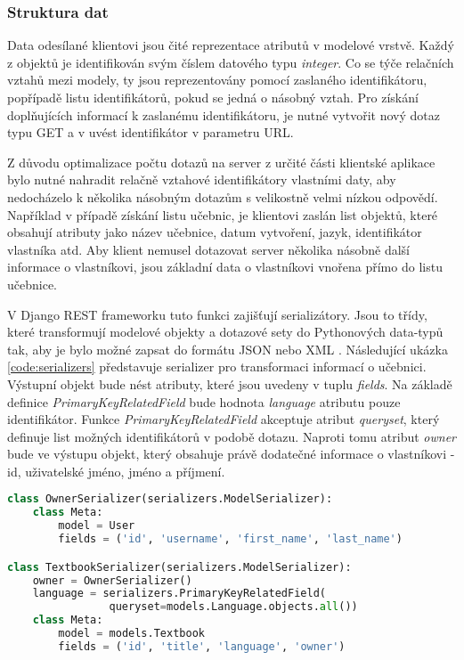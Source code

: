 \documentclass[a4paper,11pt,titlepage,fleqn]{article}
\begin{document}
        \subsubsection{Struktura dat}
            Data odesílané klientovi jsou čité reprezentace atributů v modelové vrstvě. Každý z objektů je identifikován svým číslem datového typu \textit{integer}. Co se týče relačních vztahů mezi modely, ty jsou reprezentovány pomocí zaslaného identifikátoru, popřípadě listu identifikátorů, pokud se jedná o násobný vztah. Pro získání doplňujících informací k zaslanému identifikátoru, je nutné vytvořit nový dotaz typu GET a v uvést identifikátor v parametru URL. 

            Z důvodu optimalizace počtu dotazů na server z určité části klientské aplikace bylo nutné nahradit relačně vztahové identifikátory vlastními daty, aby nedocházelo k několika násobným dotazům s velikostně velmi nízkou odpovědí. Například v případě získání listu učebnic, je klientovi zaslán list objektů, které obsahují atributy jako název učebnice, datum vytvoření, jazyk, identifikátor vlastníka atd. Aby klient nemusel dotazovat server několika násobně další informace o vlastníkovi, jsou základní data o vlastníkovi vnořena přímo do listu učebnice.

            V Django REST frameworku tuto funkci zajišťují serializátory. Jsou to třídy, které transformují modelové objekty a dotazové sety do Pythonových data-typů tak, aby je bylo možné zapsat do formátu JSON nebo XML \cite{bib:django-rest}. Následující ukázka \ref{code:serializers} představuje serializer pro transformaci informací o učebnici. Výstupní objekt bude nést atributy, které jsou uvedeny v tuplu \textit{fields}. Na základě definice \textit{PrimaryKeyRelatedField} bude hodnota \textit{language} atributu pouze identifikátor. Funkce \textit{PrimaryKeyRelatedField} akceptuje atribut \textit{queryset}, který definuje list možných identifikátorů v podobě dotazu. Naproti tomu atribut \textit{owner} bude ve výstupu objekt, který obsahuje právě dodatečné informace o vlastníkovi - id, uživatelské jméno, jméno a příjmení. 

\begin{lstlisting}[language=Python, caption={Serializační třída k transformaci dat o učebnici},label=code:serializers]
class OwnerSerializer(serializers.ModelSerializer):
    class Meta:
        model = User
        fields = ('id', 'username', 'first_name', 'last_name')

class TextbookSerializer(serializers.ModelSerializer):
    owner = OwnerSerializer()
    language = serializers.PrimaryKeyRelatedField(
                queryset=models.Language.objects.all())
    class Meta:
        model = models.Textbook
        fields = ('id', 'title', 'language', 'owner')
\end{lstlisting}
\end{document}
